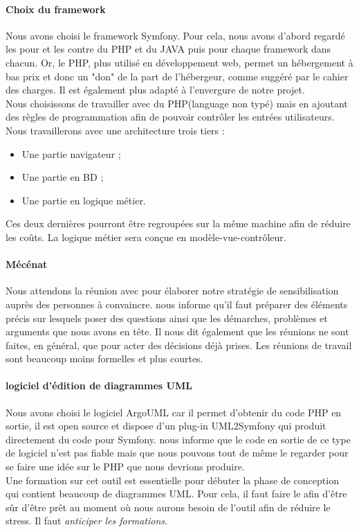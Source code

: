 \documentclass [a4paper] {article}
\begin{document}
\paragraph*{Choix du framework}
Nous avons choisi le framework Symfony. Pour cela, nous avons d'abord regardé les pour et les contre du PHP et du JAVA puis pour chaque framework dans chacun. Or, le PHP, plus utilisé en développement web, permet un hébergement à bas prix et donc un "don" de la part de l'hébergeur, comme suggéré par le cahier des charges. Il est également plus adapté à l'envergure de notre projet.
\\
Nous choisissons de travailler avec du PHP(language non typé) mais en ajoutant des règles de programmation afin de pouvoir contrôler les entrées utilisateurs.
\\
Nous travaillerons avec une architecture trois tiers :
\begin{itemize}
\item Une partie navigateur ;
\item Une partie en BD ;
\item Une partie en logique métier.
\end{itemize}
Ces deux dernières pourront être regroupées sur la même machine afin de réduire les coûts. La logique métier sera conçue en modèle-vue-contrôleur.

\paragraph*{Mécénat}
Nous attendons la réunion avec \nomTuteurCom{} pour élaborer notre stratégie de sensibilisation auprès des personnes à convaincre. \nomTuteurPedago{} nous informe qu'il faut préparer des éléments précis sur lesquels poser des questions ainsi que les démarches, problèmes et arguments que nous avons en tête. Il nous dit également que les réunions ne sont faites, en général, que pour acter des décisions déjà prises. Les réunions de travail sont beaucoup moins formelles et plus courtes.

\paragraph*{logiciel d'édition de diagrammes UML}
Nous avons choisi le logiciel ArgoUML car il permet d'obtenir du code PHP en sortie, il est open source et dispose d'un plug-in UML2Symfony qui produit directement du code pour Symfony. \nomTuteurPedago{} nous informe que le code en sortie de ce type de logiciel n'est pas fiable mais que nous pouvons tout de même le regarder pour se faire une idée sur le PHP que nous devrions produire.
\\
Une formation sur cet outil est essentielle pour débuter la phase de conception qui contient beaucoup de diagrammes UML. Pour cela, il faut faire le \PF{} afin d’être sûr d’être prêt au moment où nous aurons besoin de l'outil afin de réduire le stress. Il faut \emph{anticiper les formations}.
\end{document}
